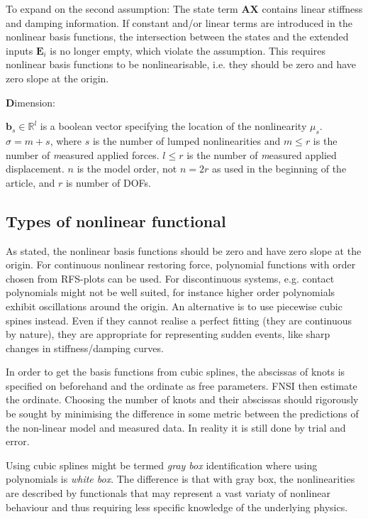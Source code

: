 To expand on the second assumption:
The state term $\bm A \bm X$ contains linear stiffness and damping information.
If constant and/or linear terms are introduced in the nonlinear basis functions,
the intersection between the states and the extended inputs $\bm E_i$ is no
longer empty, which violate the assumption.
This requires nonlinear basis functions to be nonlinearisable, i.e. they should
be zero and have zero slope at the origin.



{\textbf Dimension:}

$\bm b_s \in \mathbb{R}^l$ is a boolean vector specifying the location of the
nonlinearity $\mu_s$.
$\sigma = m + s$, where $s$ is the number of lumped nonlinearities and $m \leq
r$ is the number of {\textit measured applied forces}. $l \leq r$ is the number of
{\textit measured applied displacement}.
$n$ is the model order, not $n=2r$ as used in the beginning of the article, and
$r$ is number of DOFs.



\subsection{Types of nonlinear functional}
\label{sec:fnsi_functional}


As stated, the nonlinear basis functions should be zero and have zero slope at
the origin. For continuous nonlinear restoring force, polynomial functions with
order chosen from RFS-plots can be used. For discontinuous systems, e.g. contact
polynomials might not be well suited, for instance higher order polynomials
exhibit oscillations around the origin. An alternative is to use piecewise cubic
spines instead. Even if they cannot realise a perfect fitting (they are
continuous by nature), they are appropriate for representing sudden events,
like sharp changes in stiffness/damping curves.

In order to get the basis functions from cubic splines, the abscissas of knots
is specified on beforehand and the ordinate as free parameters. FNSI then
estimate the ordinate.
Choosing the number of knots and their abscissas should rigorously be sought by
minimising the difference in some metric between the predictions of the
non-linear model and measured data. In reality it is still done by trial and
error.

Using cubic splines might be termed \textit{gray box} identification where using
polynomials is \textit{white box}. The difference is that with gray box, the
nonlinearities are described by functionals that may represent a vast variaty of
nonlinear behaviour and thus requiring less specific knowledge of the underlying
physics.


